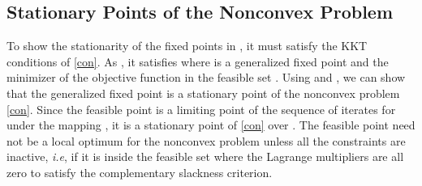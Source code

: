 \subsection{Stationary Points of the Nonconvex Problem}
To show the stationarity of the fixed points in , it must satisfy the \ac{KKT} conditions of \eqref{con}. As , it satisfies
\iftoggle{single_column}{
\begin{equation} \label{con-opt}\allowdisplaybreaks
f(\iter{\mx}{\ast}{i},\iter{\my}{\ast}{i},\iter{\mz}{\ast|x}{i}) = f(\iter{\mx}{\ast}{i+1},\iter{\my}{\ast}{i},\iter{\mz}{\ast|y}{i+1}) = 
f(\iter{\mx}{\ast}{i+1},\iter{\my}{\ast}{i+1},\iter{\mz}{\ast|x}{i+1})
\end{equation}}{
\begin{multline} \label{con-opt}\allowdisplaybreaks
f(\iter{\mx}{\ast}{i},\iter{\my}{\ast}{i},\iter{\mz}{\ast|x}{i}) = f(\iter{\mx}{\ast}{i+1},\iter{\my}{\ast}{i},\iter{\mz}{\ast|y}{i+1}) \\ = 
f(\iter{\mx}{\ast}{i+1},\iter{\my}{\ast}{i+1},\iter{\mz}{\ast|x}{i+1})
\end{multline}}
where  is a generalized fixed point and the minimizer of the objective function  in the feasible set . Using \cite[Theorem 10]{lanckriet2009convergence} and \cite[Theorems 2,11]{scutari_1}, we can show that the generalized fixed point is a stationary point of the nonconvex problem \eqref{con}. Since the feasible point  is a limiting point of the sequence of iterates  for  under the mapping , it is a stationary point of \eqref{con} over . The feasible point need not be a local optimum for the nonconvex problem unless all the constraints are inactive, \textit{i.e}, if it is inside the feasible set  where the Lagrange multipliers are all zero to satisfy the complementary slackness criterion.

